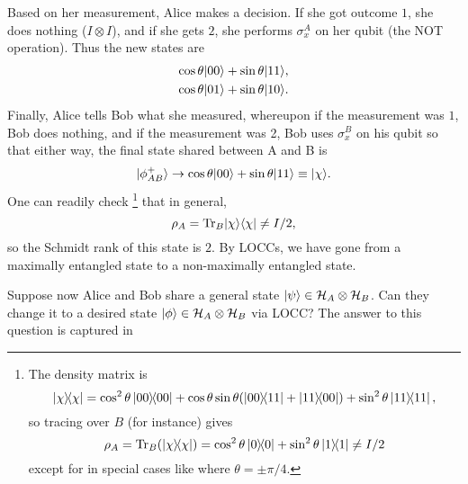 Based on her measurement, Alice makes a decision. If she got outcome $1$, she does nothing ($I\otimes I$), and if she gets $2$, she performs $\sigma_x^A$ on her qubit (the NOT operation). Thus the new states are
\begin{gather*}
    \cos\theta \lvert00\rangle+\sin\theta\lvert11\rangle,\\
    \cos\theta \lvert01\rangle + \sin\theta\lvert10\rangle.
\end{gather*}
Finally, Alice tells Bob what she measured, whereupon if the measurement was $1$, Bob does nothing, and if the measurement was 2, Bob uses $\sigma_x^B$ on his qubit so that either way, the final state shared between A and B is
\begin{equation}
    \lvert\phi_{AB}^+\rangle \to \cos\theta \lvert00\rangle + \sin\theta\lvert11\rangle \equiv \lvert\chi\rangle.
\end{equation}
One can readily check%
    \footnote{The density matrix is 
    \begin{equation*}
        \left\lvert{\chi}\middle\rangle\!\middle\langle{\chi}\right\rvert=\cos^2\theta \left\lvert{00}\middle\rangle\!\middle\langle{00}\right\rvert+\cos\theta\sin\theta(\left\lvert 00 \middle\rangle\!\middle\langle 11 \right\rvert+\left\lvert 11 \middle\rangle\!\middle\langle 00 \right\rvert)+\sin^2\theta \left\lvert{11}\middle\rangle\!\middle\langle{11}\right\rvert,
    \end{equation*}
    so tracing over $B$ (for instance) gives
    \begin{equation*}
        \rho_A = \operatorname{Tr}_B(\left\lvert{\chi}\middle\rangle\!\middle\langle{\chi}\right\rvert) = \cos^2\theta \left\lvert{0}\middle\rangle\!\middle\langle{0}\right\rvert+\sin^2\theta \left\lvert{1}\middle\rangle\!\middle\langle{1}\right\rvert \neq I/2
    \end{equation*}
    except for in special cases like where $\theta=\pm \pi/4$.
    }
that in general,
\begin{equation}
    \rho_A=\operatorname{Tr}_B \lvert\chi\rangle\langle\chi\rvert \neq I/2,
\end{equation}
so the Schmidt rank of this state is $2$. By LOCCs, we have gone from a maximally entangled state to a non-maximally entangled state.

Suppose now Alice and Bob share a general state $\lvert\psi\rangle\in \mathcal H_A \otimes \mathcal H_B$. Can they change it to a desired state $\lvert\phi\rangle\in \mathcal H_A \otimes \mathcal H_B$ via LOCC? The answer to this question is captured in 

